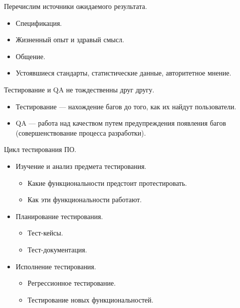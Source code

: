     \begin{Def}
        Перечислим источники ожидаемого результата.
        \begin{itemize}
            \item Спецификация.
            \item Жизненный опыт и здравый смысл.
            \item Общение.
            \item Устоявшиеся стандарты, статистические данные, авторитетное мнение.
        \end{itemize}
    \end{Def}

    \begin{Rem}
        Тестирование и QA не тождественны друг другу.
        \begin{itemize}
            \item Тестирование --- нахождение багов до того, как их найдут пользователи.
            \item QA --- работа над качеством путем предупреждения появления багов (совершенствование процесса разработки).
        \end{itemize}
    \end{Rem}

    \begin{Rem}
        Цикл тестирования ПО.
        \begin{itemize}
            \item Изучение и анализ предмета тестирования.
            \begin{itemize}
                \item Какие функциональности предстоит протестировать.
                \item Как эти функциональности работают.
            \end{itemize}
            \item Планирование тестирования.
            \begin{itemize}
                \item Тест-кейсы.
                \item Тест-документация.
            \end{itemize}
            \item Исполнение тестирования.
            \begin{itemize}
                \item Регрессионное тестирование.
                \item Тестирование новых функциональностей.
            \end{itemize}
        \end{itemize}
    \end{Rem}

